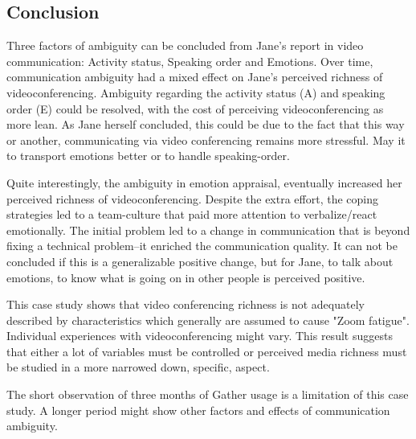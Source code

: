 \documentclass[man]{apa7}
\begin{document}
\subsection{Conclusion}

Three factors of ambiguity can be concluded from Jane's report in video communication: Activity status, Speaking order and Emotions. Over time, communication ambiguity had a mixed effect on Jane's perceived richness of videoconferencing. Ambiguity regarding the activity status (A) and speaking order (E) could be resolved, with the cost of perceiving videoconferencing as more lean. As Jane herself concluded, this could be due to the fact that this way or another, communicating via video conferencing remains more stressful. May it to transport emotions better or to handle speaking-order.

Quite interestingly, the ambiguity in emotion appraisal, eventually increased her perceived richness of videoconferencing. Despite the extra effort, the coping strategies led to a team-culture that paid more attention to verbalize/react emotionally. The initial problem led to a change in communication that is beyond fixing a technical problem–it enriched the communication quality. It can not be concluded if this is a generalizable positive change, but for Jane, to talk about emotions, to know what is going on in other people is perceived positive.

This case study shows that video conferencing richness is not adequately described by characteristics which generally are assumed to cause "Zoom fatigue". Individual experiences with videoconferencing might vary. This result suggests that either a lot of variables must be controlled or perceived media richness must be studied in a more narrowed down, specific, aspect.

The short observation of three months of Gather usage is a limitation of this case study. A longer period might show other factors and effects of communication ambiguity.

\printbibliography

\appendix
\end{document}
